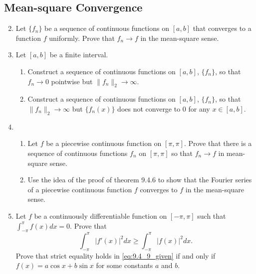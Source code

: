 \documentclass{article}
\begin{document}
\subsection{Mean-square Convergence}

\begin{enumerate}
    \setcounter{enumi}{1}
    \item Let $\{f_n\}$ be a sequence of continuous functions on $[a,b]$ that
          converges to a function $f$ uniformly. Prove that $f_n\to f$ in the
          mean-square sense.
    \item Let $[a,b]$ be a finite interval.
          \begin{enumerate}
              \item Construct a sequence of continuous functions on $[a,b]$,
                    $\{f_n\}$, so that $f_n\to 0$ pointwise but
                    $\lVert f_n\rVert_2\to\infty$.
              \item Construct a sequence of continuous functions on $[a,b]$,
                    $\{f_n\}$, so that $\lVert f_n\rVert_2\to\infty$ but
                    $\{f_n(x)\}$ does not converge to 0 for any $x\in[a,b]$.
          \end{enumerate}
          \setcounter{enumi}{5}
    \item \begin{enumerate}
              \item Let $f$ be a piecewise continuous function on $[\pi,\pi]$.
                    Prove that there is a sequence of continuous functions
                    $f_n$ on $[\pi,\pi]$ so that $f_n\to f$ in mean-square sense.
              \item Use the idea of the proof of theorem 9.4.6 to show that
                    the Fourier series of a piecewise continuous function $f$
                    converges to $f$ in the mean-square sense.
          \end{enumerate}
          \setcounter{enumi}{8}
    \item Let $f$ be a continuously differentiable function on $[-\pi,\pi]$
          such that \\$\int_{-\pi}^\pi f(x)dx=0$. Prove that
              \begin{equation}
                  \int_{-\pi}^\pi \lvert f'(x)\rvert^2dx
                  \geq \int_{-\pi}^\pi \lvert f(x)\rvert^2dx.
                  \label{eq:9.4_9_given}
              \end{equation}
              Prove that strict equality holds in \eqref{eq:9.4_9_given} if and
              only if $f(x)=a\cos x+b\sin x$ for some constants $a$ and $b$.
\end{enumerate}
\end{document}
